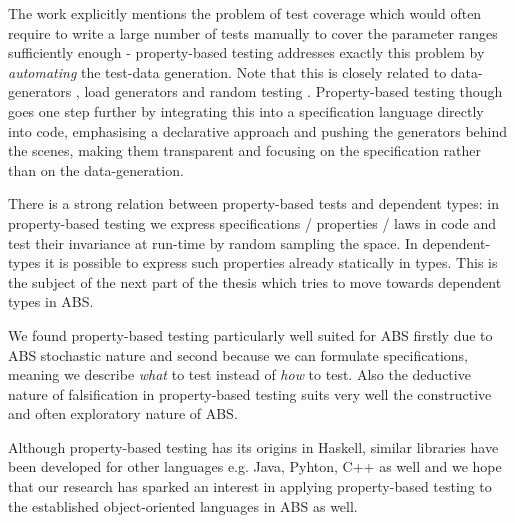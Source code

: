 The work \cite{onggo_test-driven_2016} explicitly mentions the problem of test coverage which would often require to write a large number of tests manually to cover the parameter ranges sufficiently enough - property-based testing addresses exactly this problem by \textit{automating} the test-data generation. Note that this is closely related to data-generators \cite{gurcan_generic_2013}, load generators and random testing \cite{burnstein_practical_2010}. Property-based testing though goes one step further by integrating this into a specification language directly into code, emphasising a declarative approach and pushing the generators behind the scenes, making them transparent and focusing on the specification rather than on the data-generation. 





There is a strong relation between property-based tests and dependent types: in property-based testing we express specifications / properties / laws in code and test their invariance at run-time by random sampling the space. In dependent-types it is possible to express such properties already statically in types. This is the subject of the next part of the thesis which tries to move towards dependent types in ABS.

We found property-based testing particularly well suited for ABS firstly due to ABS stochastic nature and second because we can formulate specifications, meaning we describe \textit{what} to test instead of \textit{how} to test. Also the deductive nature of falsification in property-based testing suits very well the constructive and often exploratory nature of ABS. 

Although property-based testing has its origins in Haskell, similar libraries have been developed for other languages e.g. Java, Pyhton, C++ as well and we hope that our research has sparked an interest in applying property-based testing to the established object-oriented languages in ABS as well.

%









